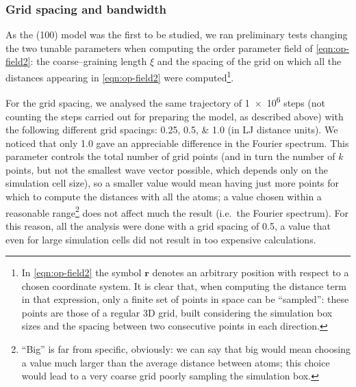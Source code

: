 \subsubsection{Grid spacing and bandwidth}
As the (100) model was the first to be studied, we ran preliminary tests changing the two tunable parameters when computing the order parameter field of \cref{eqn:op-field2}: the coarse--graining length $\xi$ and the spacing of the grid on which all the distances appearing in \cref{eqn:op-field2} were computed\footnote{In \cref{eqn:op-field2} the symbol $\bm{r}$ denotes an arbitrary position with respect to a chosen coordinate system. It is clear that, when computing the distance term in that expression, only a finite set of points in space can be ``sampled'': these points are those of a regular 3D grid, built considering the simulation box sizes and the spacing between two consecutive points in each direction.}.

For the grid spacing, we analysed the same trajectory of \num{1e6} steps (not counting the steps carried out for preparing the model, as described above) with the following different grid spacings: \numlist{0.25;0.5;1.0} (in LJ distance units). We noticed that only \num{1.0} gave an appreciable difference in the Fourier spectrum. This parameter controls the total number of grid points (and in turn the number of $k$ points, but not the smallest wave vector possible, which depends only on the simulation cell size), so a smaller value would mean having just more points for which to compute the distances with all the atoms; a value chosen within a reasonable range\footnote{``Big'' is far from specific, obviously: we can say that big would mean choosing a value much larger than the average distance between atoms; this choice would lead to a very coarse grid poorly sampling the simulation box.} does not affect much the result (i.e.\ the Fourier spectrum). For this reason, all the analysis were done with a grid spacing of \num{0.5}, a value that even for large simulation cells did not result in too expensive calculations.

